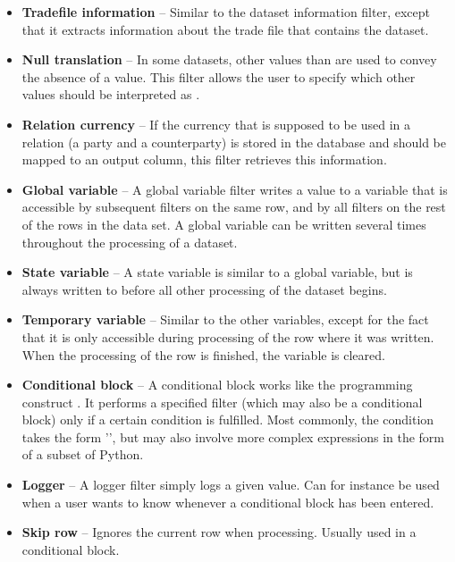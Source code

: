 \begin{itemize}
\item \textbf{Tradefile information} --
Similar to the dataset information filter, except that it extracts information about the trade file that contains the dataset.

\item \textbf{Null translation} --
In some datasets, other values than  are used to convey the absence of a value. This filter allows the user to specify which other values
should be interpreted as .

\item \textbf{Relation currency} --
If the currency that is supposed to be used in a relation (a party and a counterparty) is stored in the database and should be mapped to an output column, this
filter retrieves this information.

\item \textbf{Global variable} --
A global variable filter writes a value to a variable that is accessible by subsequent filters on the same row, and by all filters on the rest of the rows in the data
set. A global variable can be written several times throughout the processing of a dataset.

\item \textbf{State variable} --
A state variable is similar to a global variable, but is always written to before all other processing of the dataset begins.

\item \textbf{Temporary variable} --
Similar to the other variables, except for the fact that it is only accessible during processing of the row where it was written. When the 
processing of the row is finished, the variable is cleared.

\item \textbf{Conditional block} --
A conditional block works like the programming construct . It performs a specified filter (which may also be a conditional block) only if a certain
condition is fulfilled. Most commonly, the condition takes the form '', but may also involve more complex expressions in the form of a
subset of Python.

\item \textbf{Logger} --
A logger filter simply logs a given value. Can for instance be used when a user wants to know whenever a conditional block has been entered.

\item \textbf{Skip row} --
Ignores the current row when processing. Usually used in a conditional block.


\end{itemize}
